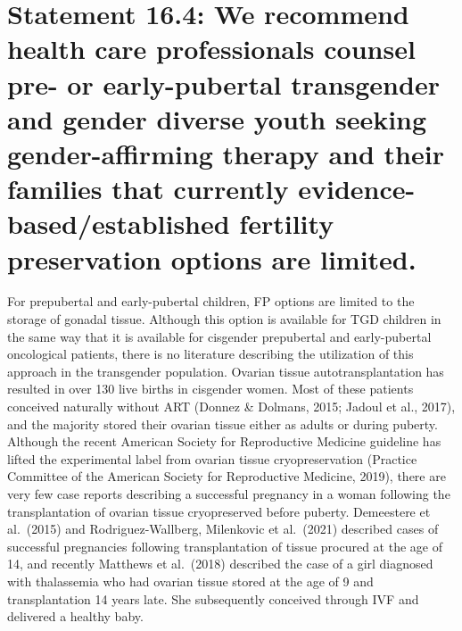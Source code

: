 \documentclass[
]{book}
\begin{document}
\hypertarget{statement-16.4-we-recommend-health-care-professionals-counsel-pre--or-early-pubertal-transgender-and-gender-diverse-youth-seeking-gender-affirming-therapy-and-their-families-that-currently-evidence-basedestablished-fertility-preservation-options-are-limited.}{%
\section*{Statement 16.4: We recommend health care professionals counsel pre- or early-pubertal transgender and gender diverse youth seeking gender-affirming therapy and their families that currently evidence-based/established fertility preservation options are limited.}\label{statement-16.4-we-recommend-health-care-professionals-counsel-pre--or-early-pubertal-transgender-and-gender-diverse-youth-seeking-gender-affirming-therapy-and-their-families-that-currently-evidence-basedestablished-fertility-preservation-options-are-limited.}}

For prepubertal and early-pubertal children,
FP options are limited to the storage of gonadal
tissue. Although this option is available for TGD
children in the same way that it is available for
cisgender prepubertal and early-pubertal oncological patients, there is no literature describing
the utilization of this approach in the transgender
population. Ovarian tissue autotransplantation has
resulted in over 130 live births in cisgender
women. Most of these patients conceived naturally without ART (Donnez \& Dolmans, 2015;
Jadoul et al., 2017), and the majority stored their
ovarian tissue either as adults or during puberty.
Although the recent American Society for
Reproductive Medicine guideline has lifted the
experimental label from ovarian tissue cryopreservation (Practice Committee of the American
Society for Reproductive Medicine, 2019), there
are very few case reports describing a successful
pregnancy in a woman following the transplantation of ovarian tissue cryopreserved before
puberty. Demeestere et al.~(2015) and
Rodriguez-Wallberg, Milenkovic et al.~(2021)
described cases of successful pregnancies following transplantation of tissue procured at the age
of 14, and recently Matthews et al.~(2018)
described the case of a girl diagnosed with thalassemia who had ovarian tissue stored at the age
of 9 and transplantation 14 years late. She subsequently conceived through IVF and delivered
a healthy baby.
\end{document}
